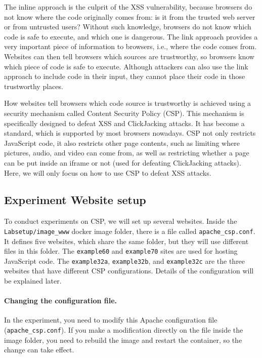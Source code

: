 The inline approach is the culprit of the XSS vulnerability, because
browsers do not know where the code originally comes from: is it from the trusted
web server or from untrusted users? Without such knowledge, browsers
do not know which code is safe to execute, and
which one is dangerous.
The link approach provides a very important piece of information to
browsers, i.e., where
the code comes from. Websites can then tell browsers which sources are
trustworthy, so browsers know which piece of code is safe to execute.
Although attackers can also use the link approach to
include code in their input, they cannot place their code in
those trustworthy places.

How websites tell browsers which code source is trustworthy is achieved
using a security mechanism called Content Security Policy (CSP). This
mechanism is specifically designed to defeat XSS and ClickJacking attacks.
It has become a standard, which is supported by most browsers nowadays.
CSP not only restricts JavaScript code, it also restricts other page contents, such as
limiting where pictures, audio, and video can come from, as well as restricting
whether a page can be put inside an iframe or not (used for defeating ClickJacking
attacks). Here, we will only focus on how to use CSP to defeat XSS attacks.



\subsection{Experiment Website setup} 

To conduct experiments on CSP, we will set up several websites. 
Inside the \texttt{Labsetup/image\_www} docker image folder, 
there is a file called \texttt{apache\_csp.conf}.
It defines five websites, which share the same folder, but
they will use different files in this folder. 
The \texttt{example60} and \texttt{example70} sites are 
used for hosting JavaScript code.  The 
\texttt{example32a}, \texttt{example32b}, and 
\texttt{example32c} are the three websites that 
have different CSP configurations. Details of the configuration 
will be explained later.


\paragraph{Changing the configuration file.}
In the experiment, you need to modify this Apache 
configuration file (\texttt{apache\_csp.conf}). If you make a modification
directly on the file inside the image folder, you need to rebuild the image
and restart the container, so the change can take effect. 

